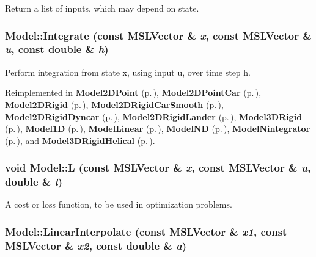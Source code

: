 Return a list of inputs, which may depend on state.

\subsubsection{ Model::Integrate (const {\bf MSLVector} \& {\em x}, const {\bf MSLVector} \& {\em u}, const double \& {\em h})\hspace{0.3cm}{\tt  [pure virtual]}}\label{class_Model_a5}


Perform integration from state x, using input u, over time step h.



Reimplemented in {\bf Model2DPoint} {\rm (p.\,\pageref{class_Model2DPoint_a2})}, {\bf Model2DPoint\-Car} {\rm (p.\,\pageref{class_Model2DPointCar_a2})}, {\bf Model2DRigid} {\rm (p.\,\pageref{class_Model2DRigid_a2})}, {\bf Model2DRigid\-Car\-Smooth} {\rm (p.\,\pageref{class_Model2DRigidCarSmooth_a3})}, {\bf Model2DRigid\-Dyncar} {\rm (p.\,\pageref{class_Model2DRigidDyncar_a2})}, {\bf Model2DRigid\-Lander} {\rm (p.\,\pageref{class_Model2DRigidLander_a2})}, {\bf Model3DRigid} {\rm (p.\,\pageref{class_Model3DRigid_a2})}, {\bf Model1D} {\rm (p.\,\pageref{class_Model1D_a3})}, {\bf Model\-Linear} {\rm (p.\,\pageref{class_ModelLinear_a3})}, {\bf Model\-ND} {\rm (p.\,\pageref{class_ModelND_a3})}, {\bf Model\-Nintegrator} {\rm (p.\,\pageref{class_ModelNintegrator_a3})}, and {\bf Model3DRigid\-Helical} {\rm (p.\,\pageref{class_Model3DRigidHelical_a3})}.
\subsubsection{\setlength{\rightskip}{0pt plus 5cm}void Model::L (const {\bf MSLVector} \& {\em x}, const {\bf MSLVector} \& {\em u}, double \& {\em l})\hspace{0.3cm}{\tt  [inline, virtual]}}\label{class_Model_a12}


A cost or loss function, to be used in optimization problems.

\subsubsection{ Model::Linear\-Interpolate (const {\bf MSLVector} \& {\em x1}, const {\bf MSLVector} \& {\em x2}, const double \& {\em a})\hspace{0.3cm}{\tt  [virtual]}}\label{class_Model_a6}


